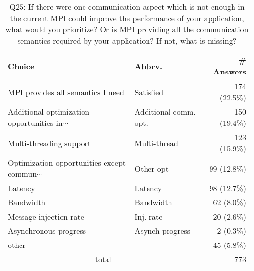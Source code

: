 \begin{table}[htb]%
\begin{center}%
\caption{Q25: If there were one communication aspect which is not enough in the current MPI could improve the performance of your application, what would you prioritize? Or is MPI providing all the communication semantics required by your application? If not, what is missing?}%
\label{tab:Q25-ans}%
\begin{tabular}{l|l|r}%
\hline%
Choice & Abbrv. & \# Answers \\%
\hline%
MPI provides all semantics I need & Satisfied & 174 (22.5\%) \\%
{\small Additional optimization opportunities in$\cdots$} & Additional comm. opt. & 150 (19.4\%) \\%
Multi-threading support & Multi-thread & 123 (15.9\%) \\%
{\small Optimization opportunities except commun$\cdots$} & Other opt & 99 (12.8\%) \\%
Latency & Latency & 98 (12.7\%) \\%
Bandwidth & Bandwidth & 62 (8.0\%) \\%
Message injection rate & Inj. rate & 20 (2.6\%) \\%
Asynchronous progress & Asynch progress & 2 (0.3\%) \\%
other & - & 45 (5.8\%) \\%
\hline%
\multicolumn{2}{c}{total} & 773 \\%
\hline%
\end{tabular}%
\end{center}%
\end{table}%
